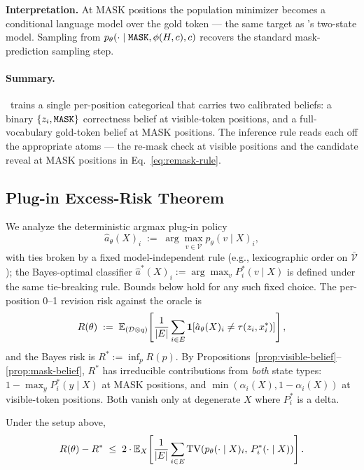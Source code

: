 \textbf{Interpretation.} At MASK positions the population minimizer becomes a conditional language model over the gold token --- the same target as \cite{nie2025large}'s two-state model. Sampling from $p_\theta(\cdot \mid \texttt{MASK}, \phi(H, c), c)$ recovers the standard mask-prediction sampling step.

\paragraph{Summary.} \method\ trains a single per-position categorical that carries two calibrated beliefs: a binary $\{z_i, \texttt{MASK}\}$ correctness belief at visible-token positions, and a full-vocabulary gold-token belief at MASK positions. The inference rule reads each off the appropriate atoms --- the re-mask check at visible positions and the candidate reveal at MASK positions in Eq.~\ref{eq:remask-rule}.

\subsection{Plug-in Excess-Risk Theorem}
\label{app:plugin-excess-risk}

We analyze the deterministic argmax plug-in policy
\[
\hat{a}_\theta(X)_i \;:=\; \arg\max_{v \in \bar{\mathcal{V}}} p_\theta(v \mid X)_i,
\]
with ties broken by a fixed model-independent rule (e.g., lexicographic order on $\bar{\mathcal{V}}$); the Bayes-optimal classifier $\hat{a}^*(X)_i := \arg\max_v P^*_i(v \mid X)$ is defined under the same tie-breaking rule. Bounds below hold for any such fixed choice. The per-position 0--1 revision risk against the oracle is
\[
R(\theta) \;:=\; \mathbb{E}_{(\mathcal{D} \otimes q)}\!\left[\frac{1}{|E|} \sum_{i \in E} \mathbf{1}\!\left[\hat{a}_\theta(X)_i \neq \tau(z_i, x^{\ast}_i)\right]\right],
\]
and the Bayes risk is $R^* := \inf_p R(p)$. By Propositions~\ref{prop:visible-belief}--\ref{prop:mask-belief}, $R^*$ has irreducible contributions from \emph{both} state types: $1 - \max_y P^*_i(y \mid X)$ at MASK positions, and $\min(\alpha_i(X), 1 - \alpha_i(X))$ at visible-token positions. Both vanish only at degenerate $X$ where $P^*_i$ is a delta.

\begin{theorem}
\label{thm:plugin-excess-risk}
Under the setup above,
\[
R(\theta) - R^{*} \;\leq\; 2 \cdot \mathbb{E}_X\!\left[\frac{1}{|E|} \sum_{i \in E} \mathrm{TV}\!\left(p_\theta(\cdot \mid X)_i,\,P^*_i(\cdot \mid X)\right)\right].
\]
\end{theorem}

